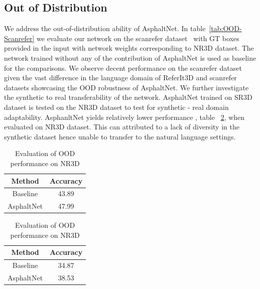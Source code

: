 \documentclass[10pt,twocolumn,letterpaper]{article}
\begin{document}
\subsection{Out of Distribution} We address the out-of-distribution ability of AsphaltNet. In table~\ref{tab:OOD-Scanrefer} we evaluate our network on the scanrefer dataset~\cite{chen2020scanrefer} with GT boxes provided in the input with network weights corresponding to NR3D dataset. The network trained without any of the contribution of AsphaltNet is used as baseline for the comparisons. We observe decent performance on the scanrefer dataset given the vast difference in the language domain of ReferIt3D and scanrefer datasets showcasing the OOD robustness of AsphaltNet. We further investigate the synthetic to real transferability of the network. AsphaltNet trained on SR3D dataset is tested on the NR3D dataset to test for synthetic - real domain adaptability. AsphanltNet yields relatively lower performance , table ~\ref{tab:OOD-NR3D}, when evaluated on NR3D dataset. This can attributed to a lack of diversity in the synthetic dataset hence unable to transfer to the natural language settings.  

\begin{table}[]
    
\begin{minipage}{.23\textwidth}

    \centering
    \begin{tabular}{|c|c|}
        \hline
        Method & Accuracy  \\
         \hline
         Baseline & 43.89 \\ 
         AsphaltNet & 47.99 \\
         \hline
    \end{tabular}
    \caption{Evaluation of OOD performance on ScanRefer}
    \label{tab:OOD-Scanrefer}
\end{minipage}
\hfill
\begin{minipage}{.23\textwidth}
    \centering
    \begin{tabular}{|c|c|}
        \hline
        Method & Accuracy  \\
         \hline
         Baseline & 34.87 \\ 
         AsphaltNet & 38.53 \\
         \hline
    \end{tabular}
    \caption{Evaluation of OOD performance on NR3D}
    \label{tab:OOD-NR3D}
\end{minipage}
\end{table}
\end{document}
